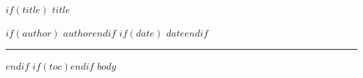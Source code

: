 \documentclass[$if(fontsize)$$fontsize$$else$11pt$endif$,$for(classoption)$$classoption$$sep$,$endfor$]{article}
\begin{document}
$if(title)$
{\huge\bfseries $title$}\par\vspace{4pt}
$if(author)${\color{mutedgray} $author$}$endif$
$if(date)$\hfill{\small\color{mutedgray} $date$}$endif$
\par\vspace{4pt}\rule{\textwidth}{0.4pt}\vspace{12pt}
$endif$
$if(toc)$\tableofcontents\clearpage$endif$
$body$
\end{document}
